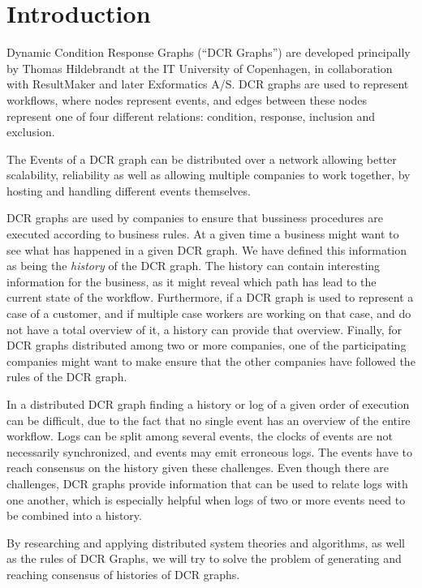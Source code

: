 \chapter{Introduction}
	Dynamic Condition Response Graphs (“DCR Graphs”) are developed principally by Thomas Hildebrandt at the IT University of Copenhagen, in collaboration with ResultMaker and later Exformatics A/S. DCR graphs are used to represent workflows, where nodes represent events, and edges between these nodes represent one of four different relations: condition, response, inclusion and exclusion. 
	
	\newpar The Events of a DCR graph can be distributed over a network allowing better scalability, reliability as well as allowing multiple companies to work together, by hosting and handling different events themselves. 
	
	\newpar DCR graphs are used by companies to ensure that bussiness procedures are executed according to business rules. At a given time a business might want to see what has happened in a given DCR graph. We have defined this information as being the \textit{history} of the DCR graph. The history can contain interesting information for the business, as it might reveal which path has lead to the current state of the workflow. Furthermore, if a DCR graph is used to represent a case of a customer, and if multiple case workers are working on that case, and do not have a total overview of it, a history can provide that overview. Finally, for DCR graphs distributed among two or more companies, one of the participating companies might want to make ensure that the other companies have followed the rules of the DCR graph.
	
	\newpar In a distributed DCR graph finding a history or log of a given order of execution can be difficult, due to the fact that no single event has an overview of the entire workflow. Logs can be split among several events, the clocks of events are not necessarily synchronized, and events may emit erroneous logs. The events have to reach consensus on the history given these challenges. Even though there are challenges, DCR graphs provide information that can be used to relate logs with one another, which is especially helpful when logs of two or more events need to be combined into a history.
	
	\newpar By researching and applying distributed system theories and algorithms, as well as the rules of DCR Graphs, we will try to solve the problem of generating and reaching consensus of histories of DCR graphs. 